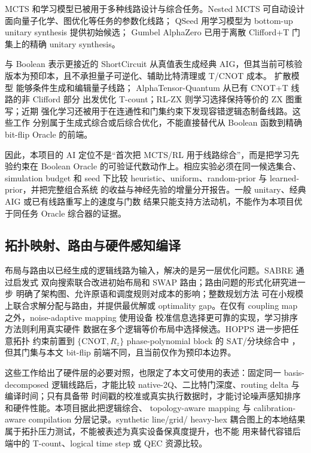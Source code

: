 \documentclass[UTF8,a4paper,12pt]{ctexart}
\begin{document}
MCTS 和学习模型已被用于多种线路设计与综合任务。Nested MCTS
\allowbreak\cite{wang2023nestedmcts} 可自动设计面向量子化学、图优化等任务的参数化线路；
QSeed\allowbreak\cite{weiden2023qseed} 用学习模型为 bottom-up unitary synthesis 提供初始候选；
Gumbel AlphaZero\allowbreak\cite{rietsch2024rlsynthesis} 已用于离散 Clifford+T 门集上的精确
unitary synthesis。

与 Boolean 表示更接近的 ShortCircuit\allowbreak\cite{tsaras2024shortcircuit} 从真值表生成经典
AIG，但其当前可核验版本为预印本，且不承担量子可逆化、辅助比特清理或 T/CNOT 成本。
扩散模型\allowbreak\cite{fuerrutter2024diffusion} 能够条件生成和编辑量子线路；
AlphaTensor-Quantum\allowbreak\cite{ruiz2025alphatensor} 从已有 CNOT+T 线路的非 Clifford 部分
出发优化 T-count；RL-ZX\allowbreak\cite{riu2025rlzx} 则学习选择保持等价的 ZX 图重写；近期
强化学习还被用于在连通性和门集约束下发现容错逻辑态制备线路\cite{zen2025rlft}。这些工作
分别属于生成式综合或后综合优化，不能直接替代从 Boolean 函数到精确 bit-flip Oracle
的前端。

因此，本项目的 AI 定位不是“首次把 MCTS/RL 用于线路综合”，而是把学习先验约束在
Boolean Oracle 的可验证代数动作上。相应实验必须在同一候选集合、simulation budget
和 seed 下比较 heuristic、uniform、random-prior 与 learned-prior，并把完整组合系统
的收益与神经先验的增量分开报告。一般 unitary、经典 AIG 或已有线路重写上的速度与门数
结果只能支持方法动机，不能作为本项目优于同任务 Oracle 综合器的证据。

\subsection{拓扑映射、路由与硬件感知编译}

布局与路由以已经生成的逻辑线路为输入，解决的是另一层优化问题。SABRE 通过启发式
双向搜索联合改进初始布局和 SWAP 路由\cite{li2019sabre}；路由问题的形式化研究进一步
明确了架构图、允许原语和调度规则对成本的影响\cite{cowtan2019routing}；整数规划方法
可在小规模上联合求解分配与路由，并提供最优解或 optimality
gap\cite{nannicini2022ilp}。在仅有 coupling map 之外，noise-adaptive mapping 使用设备
校准信息选择更可靠的实现\cite{murali2019noiseadaptive}，学习排序方法则利用真实硬件
数据在多个逻辑等价布局中选择候选\cite{hartnett2024learningtorank}。HOPPS 进一步把任意拓扑
约束前置到 $\{\mathrm{CNOT},R_z\}$ phase-polynomial block 的 SAT/分块综合中
\cite{li2025hopps}，但其门集与本文 bit-flip 前端不同，且当前仅作为预印本边界。

这些工作给出了硬件层的必要对照，也限定了本文可使用的表述：固定同一 basis-decomposed
逻辑线路后，才能比较 native-2Q、二比特门深度、routing delta 与编译时间；只有具备带
时间戳的校准或真实执行数据时，才能讨论噪声感知排序和硬件性能。本项目据此把逻辑综合、
topology-aware mapping 与 calibration-aware compilation 分层记录。synthetic line/grid/
heavy-hex 耦合图上的本地结果属于拓扑压力测试，不能被表述为真实设备保真度提升，也不能
用来替代容错后端中的 T-count、logical time step 或 QEC 资源比较。
\end{document}
